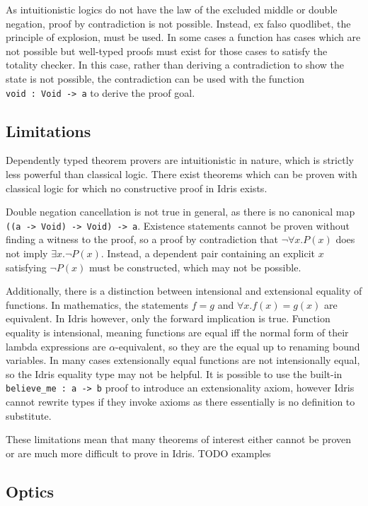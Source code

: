 \documentclass[]{report}
\begin{document}
As intuitionistic logics do not have the law of the excluded middle or double negation, proof by contradiction is not possible. Instead, ex falso quodlibet, the principle of explosion, must be used. In some cases a function has cases which are not possible but well-typed proofs must exist for those cases to satisfy the totality checker. In this case, rather than deriving a contradiction to show the state is not possible, the contradiction can be used with the function \texttt{void\ :\ Void\ ->\ a} to derive the proof goal.

\subsection{Limitations}

Dependently typed theorem provers are intuitionistic in nature, which is strictly less powerful than classical logic. There exist theorems which can be proven with classical logic for which no constructive proof in Idris exists.

Double negation cancellation is not true in general, as there is no canonical map \texttt{((a\ ->\ Void)\ ->\ Void)\ ->\ a}. Existence statements cannot be proven without finding a witness to the proof, so a proof by contradiction that $\neg\forall x.P(x)$ does not imply $\exists x.\neg P(x)$. Instead, a dependent pair containing an explicit $x$ satisfying $\neg P(x)$ must be constructed, which may not be possible.

Additionally, there is a distinction between intensional and extensional equality of functions. In mathematics, the statements $f=g$ and $\forall x. f(x)=g(x)$ are equivalent. In Idris however, only the forward implication is true. Function equality is intensional, meaning functions are equal iff the normal form of their lambda expressions are $\alpha$-equivalent, so they are the equal up to renaming bound variables. In many cases extensionally equal functions are not intensionally equal, so the Idris equality type may not be helpful. It is possible to use the built-in \texttt{believe\_me\ :\ a\ ->\ b} proof to introduce an extensionality axiom, however Idris cannot rewrite types if they invoke axioms as there essentially is no definition to substitute.

These limitations mean that many theorems of interest either cannot be proven or are much more difficult to prove in Idris. TODO examples

\subsection{Optics}
\end{document}
